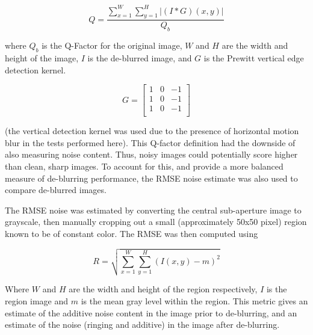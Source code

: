 \begin{equation}
Q = \frac{\sum_{x=1}^{W} \sum_{y=1}^{H}
\left| (I \ast G)(x, y) \right|
\label{eq:q_factor}}{Q_b}
\end{equation}

where $Q_b$ is the Q-Factor for the original image, $W$ and $H$ are the width and height of the image, $I$ is the de-blurred image, and $G$ is the Prewitt vertical edge detection kernel.

\begin{equation}
G = 
\begin{bmatrix}
1 & 0 & -1 \\
1 & 0 & -1 \\
1 & 0 & -1 \\
\end{bmatrix}
\label{eq:prewitt_filter}
\end{equation}

(the vertical detection kernel was used due to the presence of horizontal motion blur in the tests performed here).
This Q-factor definition had the downside of also measuring noise content.
Thus, noisy images could potentially score higher than clean, sharp images.
To account for this, and provide a more balanced measure of de-blurring performance, the RMSE noise estimate was also used to compare de-blurred images.

The RMSE noise was estimated by converting the central sub-aperture image to grayscale, then manually cropping out a small (approximately 50x50 pixel) region known to be of constant color.
The RMSE was then computed using

\begin{equation}
R = \sqrt{ \sum_{x=1}^{W} \sum_{y=1}^{H} (I(x,y) - m)^2 }
\end{equation}

Where $W$ and $H$ are the width and height of the region respectively, $I$ is the region image and $m$ is the mean gray level within the region.
This metric gives an estimate of the additive noise content in the image prior to de-blurring, and an estimate of the noise (ringing and additive) in the image after de-blurring.

